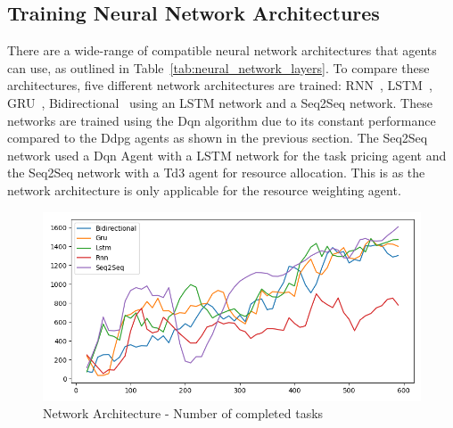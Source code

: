 
\subsection{Training Neural Network Architectures}
\label{subsec:neural-network-architecture-training}
There are a wide-range of compatible neural network architectures that agents can use, as outlined in
Table~\ref{tab:neural_network_layers}. To compare these architectures, five different network architectures are trained:
RNN~\citep{RNN}, LSTM~\citep{LSTM}, GRU~\citep{GRU}, Bidirectional~\citep{Bidirectional} using an LSTM network and
a Seq2Seq network. These networks are trained using the Dqn algorithm due to its constant performance compared to the
Ddpg agents as shown in the previous section. The Seq2Seq network used a Dqn Agent with a LSTM network for the task
pricing agent and the Seq2Seq network with a Td3 agent for resource allocation. This is as the network architecture is
only applicable for the resource weighting agent.

\begin{figure}[H]
    \centering
    \includegraphics[width=\linewidth]{figures/5_evaluation_figs/net_arch_training_fig/num_completed_tasks.png}
    \caption{Network Architecture - Number of completed tasks}
    \label{fig:net_arch_num_completed_tasks}
\end{figure}

